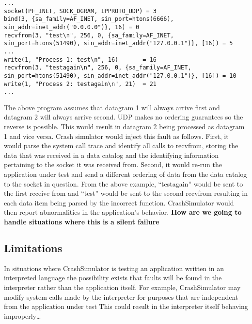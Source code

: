         \begin{verbatim}
...
socket(PF_INET, SOCK_DGRAM, IPPROTO_UDP) = 3
bind(3, {sa_family=AF_INET, sin_port=htons(6666), sin_addr=inet_addr("0.0.0.0")}, 16) = 0
recvfrom(3, "test\n", 256, 0, {sa_family=AF_INET, sin_port=htons(51490), sin_addr=inet_addr("127.0.0.1")}, [16]) = 5
...
write(1, "Process 1: test\n", 16)       = 16
recvfrom(3, "testagain\n", 256, 0, {sa_family=AF_INET, sin_port=htons(51490), sin_addr=inet_addr("127.0.0.1")}, [16]) = 10
write(1, "Process 2: testagain\n", 21)  = 21
...
        \end{verbatim}

        The above program assumes that datagram 1 will always arrive first and datagram 2 will always arrive second. UDP
        makes no ordering guarantees so the reverse is possible. This would result in datagram 2 being processed as
        datagram 1 and vice versa. Crash simulator would inject this fault as follows. First, it would parse the system
        call trace and identify all calls to recvfrom, storing the data that was received in a data catalog and the
        identifying information pertaining to the socket it was received from. Second, it would re-run the application
        under test and send a different ordering of data from the data catalog to the socket in question. From the above
        example, ``testagain'' would be sent to the first receive from and ``test'' would be sent to the second recvfrom
        resulting in each data item being parsed by the incorrect function. CrashSimulator would then report
        abnormalities in the application's behavior. \textbf{How are we going to handle situations where this is a
        silent failure}

    \subsection{Limitations}

        In situations where CrashSimulator is testing an application written in an interpreted language the possibility
        exists that faults will be found in the interpreter rather than the application itself. For example,
        CrashSimulator may modify system calls made by the interpreter for purposes that are independent from the
        application under test This could result in the interpreter itself behaving improperly\ldots{}
